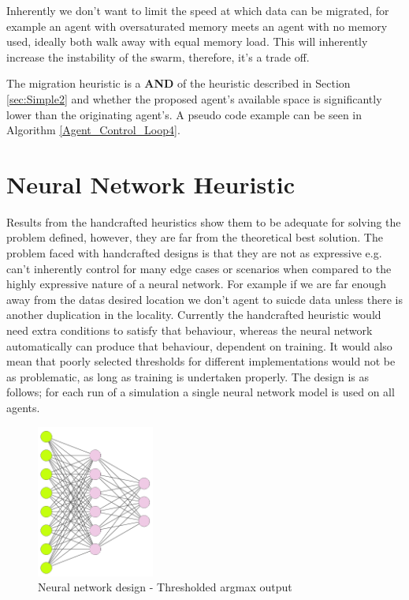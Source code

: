\documentclass{UoYCSproject}
\begin{document}
Inherently we don’t want to limit the speed at which data can be migrated, for example an agent with oversaturated memory meets an agent with no memory used, ideally both walk away with equal memory load.
This will inherently increase the instability of the swarm, therefore, it’s a trade off.

The migration heuristic is a \textbf{AND} of the heuristic described in Section \ref{sec:Simple2} and whether the proposed agent's available space is significantly lower than the originating agent’s.
A pseudo code example can be seen in Algorithm \ref{Agent_Control_Loop4}.


\section{Neural Network Heuristic}
\label{sec:Simple5}

Results from the handcrafted heuristics show them to be adequate for solving the problem defined, however, they are far from the theoretical best solution. 
The problem faced with handcrafted designs is that they are not as expressive e.g. can’t inherently control for many edge cases or scenarios when compared to the highly expressive nature of a neural network. 
For example if we are far enough away from the datas desired location we don’t agent to suicde data unless there is another duplication in the locality. 
Currently the handcrafted heuristic would need extra conditions to satisfy that behaviour, whereas the neural network automatically can produce that behaviour, dependent on training. 
It would also mean that poorly selected thresholds for different implementations would not be as problematic, as long as training is undertaken properly. 
The design is as follows; for each run of a simulation a single neural network model is used on all agents.

\begin{figure}[htb]
\label{fig:Neural network}
\begin{center}
\centering
\includegraphics[height=5cm]{"./ExplanationImgs/NN.png"}
\caption{Neural network design - Thresholded argmax output}
\end{center}
\end{figure}
\end{document}
